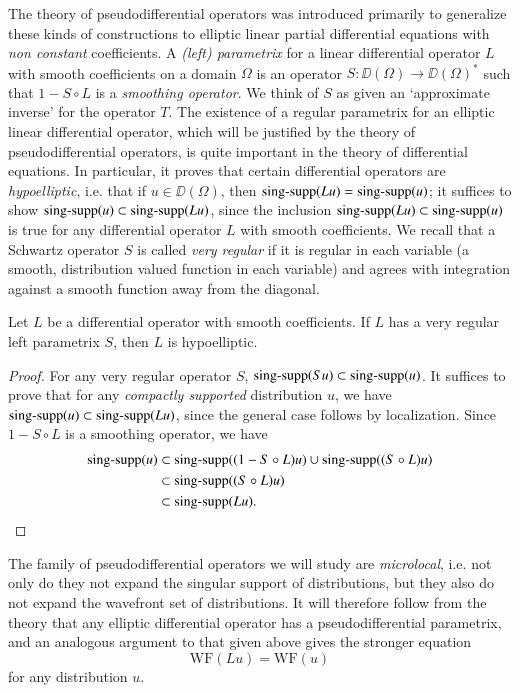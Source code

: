 The theory of pseudodifferential operators was introduced primarily to generalize these kinds of constructions to elliptic linear partial differential equations with \emph{non constant} coefficients. A \emph{(left) parametrix} for a linear differential operator $L$ with smooth coefficients on a domain $\Omega$ is an operator $S: \DD(\Omega) \to \DD(\Omega)^*$ such that $1 - S \circ L$ is a \emph{smoothing operator}. We think of $S$ as given an `approximate inverse' for the operator $T$. The existence of a regular parametrix for an elliptic linear differential operator, which will be justified by the theory of pseudodifferential operators, is quite important in the theory of differential equations. In particular, it proves that certain differential operators are \emph{hypoelliptic}, i.e. that if $u \in \DD(\Omega)$, then $\operatorname{\text{sing-supp}}(Lu) = \operatorname{\text{sing-supp}}(u)$; it suffices to show $\operatorname{\text{sing-supp}}(u) \subset \operatorname{\text{sing-supp}}(Lu)$, since the inclusion $\operatorname{\text{sing-supp}}(Lu) \subset \operatorname{\text{sing-supp}}(u)$ is true for any differential operator $L$ with smooth coefficients. We recall that a Schwartz operator $S$ is called \emph{very regular} if it is regular in each variable (a smooth, distribution valued function in each variable) and agrees with integration against a smooth function away from the diagonal.   

\begin{theorem}
    Let $L$ be a differential operator with smooth coefficients. If $L$ has a very regular left parametrix $S$, then $L$ is hypoelliptic.
\end{theorem}
\begin{proof}
    For any very regular operator $S$, $\operatorname{\text{sing-supp}}(Su) \subset \operatorname{\text{sing-supp}}(u)$. It suffices to prove that for any \emph{compactly supported} distribution $u$, we have $\operatorname{\text{sing-supp}}(u) \subset \operatorname{\text{sing-supp}}(Lu)$, since the general case follows by localization. Since $1 - S \circ L$ is a smoothing operator, we have
    \begin{align*}
        \operatorname{\text{sing-supp}}(u) &\subset \operatorname{\text{sing-supp}}((1 - S \circ L) u) \cup \operatorname{\text{sing-supp}}((S \circ L) u)\\
        &\subset \operatorname{\text{sing-supp}}((S \circ L) u)\\
        &\subset \operatorname{\text{sing-supp}}(Lu). \qedhere
    \end{align*}
\end{proof}

The family of pseudodifferential operators we will study are \emph{microlocal}, i.e. not only do they not expand the singular support of distributions, but they also do not expand the wavefront set of distributions. It will therefore follow from the theory that any elliptic differential operator has a pseudodifferential parametrix, and an analogous argument to that given above gives the stronger equation
%
\[ \text{WF}(Lu) = \text{WF}(u) \]
%
for any distribution $u$.

